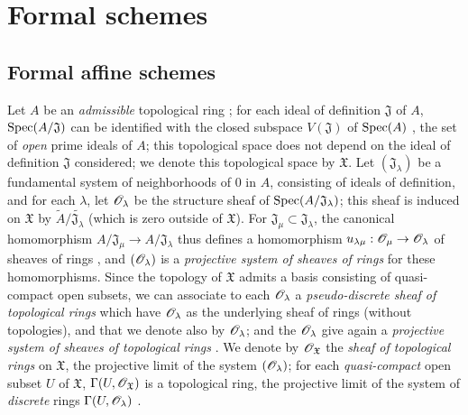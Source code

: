 \section{Formal schemes}
\label{section:I.10}

\subsection{Formal affine schemes}
\label{subsection:I.10.1}

\begin{env}[10.1.1]
\label{I.10.1.1}
Let $A$ be an \emph{admissible} topological ring ; for each ideal of definition $\mathfrak{J}$ of $A$, $\operatorname{Spec}(A/\mathfrak{J})$ can be identified with the closed subspace $V(\mathfrak{J})$ of $\operatorname{Spec}(A)$ , the set of \emph{open} prime ideals of $A$; this topological space does not depend
on the ideal of definition $\mathfrak{J}$ considered; we denote this topological space by $\mathfrak{X}$. Let $(\mathfrak{J}_\lambda)$ be a fundamental system of neighborhoods of $0$ in $A$, consisting of ideals of definition, and for each $\lambda$, let $\mathscr{O}_\lambda$ be the structure sheaf of $\operatorname{Spec}(A/\mathfrak{J}_\lambda)$; this sheaf is induced on $\mathfrak{X}$ by $\widetilde{A}/\widetilde{\mathfrak{J}_\lambda}$ (which is zero outside of $\mathfrak{X}$).
For $\mathfrak{J}_\mu\subset\mathfrak{J}_\lambda$, the canonical homomorphism $A/\mathfrak{J}_\mu\to A/\mathfrak{J}_\lambda$ thus defines a homomorphism $u_{\lambda\mu}:\sh{O}_\mu\to\sh{O}_\lambda$ of sheaves of rings , and $(\mathscr{O}_\lambda)$ is a \emph{projective system of sheaves of rings} for these homomorphisms.
Since the topology of $\mathfrak{X}$ admits a basis consisting of quasi-compact open subsets, we can associate to each $\mathscr{O}_\lambda$ a \emph{pseudo-discrete sheaf of topological rings}  which have $\mathscr{O}_\lambda$ as the underlying sheaf of rings (without topologies), and that we denote also by $\mathscr{O}_\lambda$; and the $\mathscr{O}_\lambda$ give again a \emph{projective system of sheaves of topological rings} .
We denote by $\mathscr{O}_\mathfrak{X}$ the \emph{sheaf of topological rings} on $\mathfrak{X}$, the projective limit of the system $(\mathscr{O}_\lambda)$; for each \emph{quasi-compact} open subset $U$ of $\mathfrak{X}$, $\Gamma(U,\mathscr{O}_\mathfrak{X})$ is a topological ring, the projective limit of the system of \emph{discrete} rings $\Gamma(U,\mathscr{O}_\lambda)$ .
\end{env}


